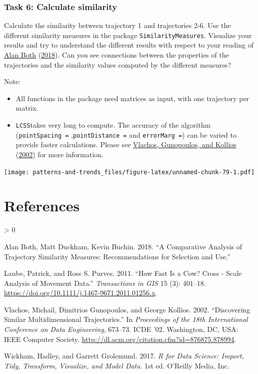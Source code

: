 \documentclass[
]{book}
\providecommand{\tightlist}{%
  \setlength{\itemsep}{0pt}\setlength{\parskip}{0pt}}
\newlength{\cslhangindent}
\newenvironment{CSLReferences}[2] %
 {%
  \setlength{\parindent}{0pt}
  \ifodd #1 \everypar{\setlength{\hangindent}{\cslhangindent}}\ignorespaces\fi
  \ifnum #2 > 0
  \setlength{\parskip}{#2\baselineskip}
  \fi
 }%
 {}
\begin{document}
\hypertarget{task-6-calculate-similarity}{%
\subsection{Task 6: Calculate similarity}\label{task-6-calculate-similarity}}

Calculate the similarity between trajectory 1 and trajectories 2-6. Use the different similarity measures in the package \texttt{SimilarityMeasures}. Visualize your results and try to understand the different results with respect to your reading of \protect\hyperlink{ref-both2018}{Alan Both} (\protect\hyperlink{ref-both2018}{2018}). Can you see connections between the properties of the trajectories and the similarity values computed by the different measures?

Note:

\begin{itemize}
\tightlist
\item
  All functions in the package need matrices as input, with one trajectory per matrix.
\item
  \texttt{LCSS}takes very long to compute. The accuracy of the algorithm (\texttt{pointSpacing\ =} ,\texttt{pointDistance\ =} and \texttt{errorMarg\ =}) can be varied to provide faster calculations. Please see \protect\hyperlink{ref-vlachos2002}{Vlachos, Gunopoulos, and Kollios} (\protect\hyperlink{ref-vlachos2002}{2002}) for more information.
\end{itemize}

\texttt{[image: patterns-and-trends\_files/figure-latex/unnamed-chunk-79-1.pdf]}

\hypertarget{references}{%
\chapter*{References}\label{references}}

\hypertarget{refs}{}
\begin{CSLReferences}{1}{0}
\leavevmode\hypertarget{ref-both2018}{}%
Alan Both, Matt Duckham, Kevin Buchin. 2018. {``A Comparative Analysis of Trajectory Similarity Measures: Recommendations for Selection and Use.''}

\leavevmode\hypertarget{ref-laube2011}{}%
Laube, Patrick, and Ross S. Purves. 2011. {``How Fast Is a Cow? Cross - Scale Analysis of Movement Data.''} \emph{Transactions in GIS} 15 (3): 401--18. \url{https://doi.org/10.1111/j.1467-9671.2011.01256.x}.

\leavevmode\hypertarget{ref-vlachos2002}{}%
Vlachos, Michail, Dimitrios Gunopoulos, and George Kollios. 2002. {``Discovering Similar Multidimensional Trajectories.''} In \emph{Proceedings of the 18th International Conference on Data Engineering}, 673--73. ICDE '02. Washington, DC, USA: IEEE Computer Society. \url{http://dl.acm.org/citation.cfm?id=876875.878994}.

\leavevmode\hypertarget{ref-wickham2017}{}%
Wickham, Hadley, and Garrett Grolemund. 2017. \emph{R for Data Science: Import, Tidy, Transform, Visualize, and Model Data}. 1st ed. O'Reilly Media, Inc.

\end{CSLReferences}
\end{document}
